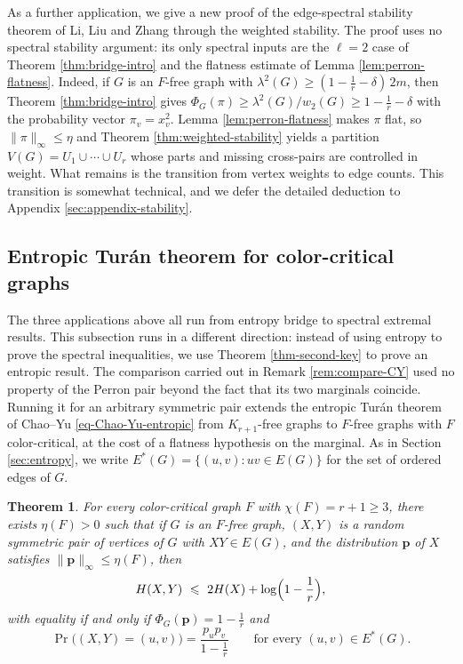 \documentclass[11pt, a4paper]{article}
\newtheorem{theorem}{Theorem}[section]
\theoremstyle{definition}
\theoremstyle{plain}
\renewcommand{\le}{\leqslant}
\renewcommand{\ge}{\geqslant}
\newcommand{\pmax}{\lVert \bm{p} \rVert_{\infty}}
\begin{document}
As a further application, we give a new proof of the
edge-spectral stability theorem of Li, Liu and Zhang
\cite[Theorem 1.6]{LLZ-ESS} through the weighted stability. The proof uses no spectral
stability argument: its only spectral inputs are the
$\ell =2$ case of Theorem \ref{thm:bridge-intro} 
and the flatness estimate of Lemma
\ref{lem:perron-flatness}. 
 Indeed, if $G$ is an $F$-free graph with 
  $\lambda^{2}(G)\ge (1-\frac1r-\delta )\,2m$, then Theorem
\ref{thm:bridge-intro} gives $\Phi_G(\pi )\ge \lambda^2(G)/ w_2(G)\ge 1-\frac1r-\delta$ with the probability vector $\pi_v=x_v^{2}$. 
Lemma \ref{lem:perron-flatness} makes $\pi$
flat, so $\lVert \pi \rVert_{\infty} \le \eta$ and Theorem \ref{thm:weighted-stability} yields a partition
$V(G)=U_1\cup \cdots \cup U_r$ whose parts and missing cross-pairs are controlled in weight. 
What remains is the transition from vertex weights to edge counts. This transition is somewhat technical, and we defer the detailed deduction to Appendix \ref{sec:appendix-stability}. 


\subsection{Entropic Tur\'{a}n theorem for color-critical graphs}

\label{subsec:entropic-turan}

The three applications above all 
run from entropy bridge to spectral extremal results. 
This subsection runs in a different direction: 
instead of using entropy to prove
the spectral inequalities, 
we use Theorem \ref{thm-second-key} to prove an entropic result.  
The comparison carried out in Remark \ref{rem:compare-CY} used no
property of the Perron pair beyond the fact that its two marginals coincide. 
Running it for an arbitrary symmetric pair extends the entropic Tur\'{a}n
theorem of Chao--Yu \eqref{eq-Chao-Yu-entropic} from $K_{r+1}$-free graphs to $F$-free graphs with $F$ color-critical, 
at the cost of a flatness hypothesis on the marginal. 
As in Section \ref{sec:entropy}, we write 
$E^{*}(G)=\{(u,v):uv\in E(G)\}$ for the set of ordered edges of $G$.

\begin{theorem}\label{thm:entropic-turan-critical}
For every color-critical graph $F$ 
with $\chi (F)=r+1\ge 3$, 
there exists $\eta (F) >0$ such that if $G$ is an
$F$-free graph, $(X,Y)$ is a random symmetric pair of vertices of $G$ with $XY\in E(G)$, and the distribution $\bm{p}$ of $X$ satisfies $\pmax \le \eta (F)$, then
\[
  H(X,Y)\ \le\ 2H(X)+\log \Bigl(1-\frac1r\Bigr),
\]
with equality if and only if $\Phi_G(\bm{p})=1-\frac1r$ and
\[ \Pr \bigl((X,Y)=(u,v)\bigr)
   =\frac{p_up_v}{1-\frac1r}
   \qquad \text{for every } (u,v)\in E^{*}(G). \] 
\end{theorem} 
\end{document}
